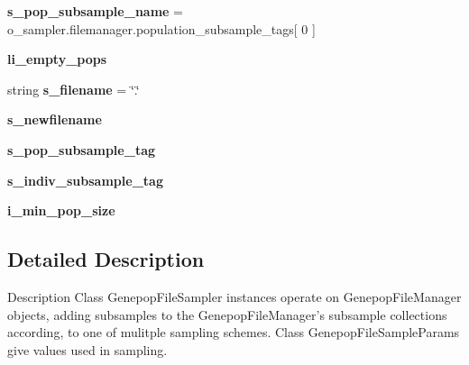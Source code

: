 \begin{DoxyCompactItemize}
\item 
{\bfseries s\+\_\+pop\+\_\+subsample\+\_\+name} = o\+\_\+sampler.\+filemanager.\+population\+\_\+subsample\+\_\+tags\mbox{[} 0 \mbox{]}\hypertarget{namespacenegui_1_1genepopfilesampler_ac829492b1237d48a4882e05b2915a6bd}{}\label{namespacenegui_1_1genepopfilesampler_ac829492b1237d48a4882e05b2915a6bd}

\item 
{\bfseries li\+\_\+empty\+\_\+pops}
\item 
string {\bfseries s\+\_\+filename} = \char`\"{}.\char`\"{}\hypertarget{namespacenegui_1_1genepopfilesampler_ac878373e2ffb8844daca12c3fe2ecba1}{}\label{namespacenegui_1_1genepopfilesampler_ac878373e2ffb8844daca12c3fe2ecba1}

\item 
{\bfseries s\+\_\+newfilename}\hypertarget{namespacenegui_1_1genepopfilesampler_a9f2406bd6f38ea68d2dc42fde6d4efd5}{}\label{namespacenegui_1_1genepopfilesampler_a9f2406bd6f38ea68d2dc42fde6d4efd5}

\item 
{\bfseries s\+\_\+pop\+\_\+subsample\+\_\+tag}\hypertarget{namespacenegui_1_1genepopfilesampler_a8bcc23e7769ceeabf1cf6baf653d1d4f}{}\label{namespacenegui_1_1genepopfilesampler_a8bcc23e7769ceeabf1cf6baf653d1d4f}

\item 
{\bfseries s\+\_\+indiv\+\_\+subsample\+\_\+tag}\hypertarget{namespacenegui_1_1genepopfilesampler_af1d202b041ee1091ede5768649f30ad0}{}\label{namespacenegui_1_1genepopfilesampler_af1d202b041ee1091ede5768649f30ad0}

\item 
{\bfseries i\+\_\+min\+\_\+pop\+\_\+size}\hypertarget{namespacenegui_1_1genepopfilesampler_a8b592ce22a43016c91eccfa209d01ab1}{}\label{namespacenegui_1_1genepopfilesampler_a8b592ce22a43016c91eccfa209d01ab1}

\end{DoxyCompactItemize}


\subsection{Detailed Description}
\begin{DoxyVerb}Description
Class GenepopFileSampler instances operate on GenepopFileManager objects,
adding subsamples to the GenepopFileManager's subsample collections according,
to one of mulitple sampling schemes.  Class GenepopFileSampleParams give 
values used in sampling.
\end{DoxyVerb}
 

